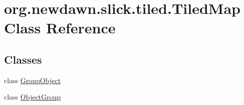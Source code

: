\hypertarget{classorg_1_1newdawn_1_1slick_1_1tiled_1_1_tiled_map}{}\section{org.\+newdawn.\+slick.\+tiled.\+Tiled\+Map Class Reference}
\label{classorg_1_1newdawn_1_1slick_1_1tiled_1_1_tiled_map}
\subsection*{Classes}
\begin{DoxyCompactItemize}
\item 
class \mbox{\hyperlink{classorg_1_1newdawn_1_1slick_1_1tiled_1_1_tiled_map_1_1_group_object}{Group\+Object}}
\item 
class \mbox{\hyperlink{classorg_1_1newdawn_1_1slick_1_1tiled_1_1_tiled_map_1_1_object_group}{Object\+Group}}
\end{DoxyCompactItemize}
